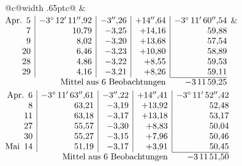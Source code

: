 \noindent\begin{tabular}{@{}c@{\hspace{.4em}\vrule width .65pt\hspace{.4em}}c@{}}
 &
 \\[.18ex]
\(\begin{array}[t]{@{}r|r|r|r|r@{}}
\text{Apr.}\enspace 5 & -3^\circ\,12'\,11''{,}92 & -3''{,}26 & +14''{,}64 & -3^\circ\,11'\,60''{,}54\\
7 & 10{,}79 & -3{,}25 & +14{,}16 & 59{,}88\\
9 & 8{,}02 & -3{,}20 & +13{,}68 & 57{,}54\\
20 & 6{,}46 & -3{,}23 & +10{,}80 & 58{,}89\\
28 & 4{,}86 & -3{,}22 & +8{,}55 & 59{,}53\\
29 & 4{,}16 & -3{,}21 & +8{,}26 & 59{,}11\\
\cline{5-5}
\multicolumn{4}{r}{\text{Mittel aus 6 Beobachtungen}} & -3\,11\,59{,}25
\end{array}\)
&
\(\begin{array}[t]{@{}r|r|r|r|r@{}}
\text{Apr.}\enspace 6 & -3^\circ\,11'\,63''{,}61 & -3''{,}22 & +14''{,}41 & -3^\circ\,11'\,52''{,}42\\
8 & 63{,}21 & -3{,}19 & +13{,}92 & 52{,}48\\
11 & 63{,}18 & -3{,}17 & +13{,}18 & 53{,}17\\
27 & 55{,}57 & -3{,}30 & +8{,}83 & 50{,}04\\
30 & 55{,}27 & -3{,}15 & +7{,}96 & 50{,}46\\
\text{Mai}\enspace 14 & 51{,}19 & -3{,}17 & +3{,}91 & 50{,}45\\
\cline{5-5}
\multicolumn{4}{r}{\text{Mittel aus 6 Beobachtungen}} & -3\,11\,51{,}50
\end{array}\)
\end{tabular}\par\medskip
